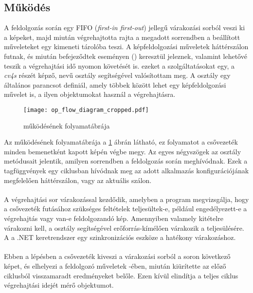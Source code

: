 \subsection{Működés} \label{ssection:mukodes} A feldolgozás során egy FIFO (\textit{first-in first-out}) jellegű várakozási sorból veszi ki a képeket, majd miután végrehajtotta rajta a megadott sorrendben a beállított műveleteket egy kimeneti tárolóba teszi. A képfeldolgozási műveletek háttérszálon futnak, és miután befejeződtek eseményen () keresztül jeleznek, valamint lehetővé teszik a végrehajtási idő nyomon követését is. ezeket a szolgáltatásokat egy, a \emph{cv4s} részét képző,  nevű osztály segítségével valósítottam meg. A  osztály egy általános parancsot definiál, amely többek között lehet egy képfeldolgozási művelet is, a  ilyen objektumokat használ a végrehajtásra.

\begin{figure}[h]
\vspace{.5cm}
\texttt{[image: op\_flow\_diagram\_cropped.pdf]}
\centering
\vspace{.2cm}
\caption{ működésének folyamatábrája}
\label{fig:op_flow_diagram}
\vspace{.5cm}
\end{figure}

Az  működésének folyamatábrája a \ref{fig:op_flow_diagram} ábrán látható, ez folyamatot a csővezeték minden bemenetként kapott képén végbe megy. Az egyes négyszögek az osztály metódusait jelentik, amilyen sorrendben a feldolgozás során meghívódnak. Ezek a tagfüggvények egy ciklusban hívódnak meg az adott alkalmazás konfigurációjának megfelelően háttérszálon, vagy az aktuális szálon.

\paragraph{} A végrehajtási sor várakozással kezdődik, amelyben a program megvizsgálja, hogy a csővezeték futásához szükséges feltételek teljesültek-e, például engedélyezett-e a végrehajtás vagy van-e feldolgozandó kép. Amennyiben valamely kitételre várakozni kell, a  osztály segítségével erőforrás-kímélően várakozik a teljesülésére. A  a .NET keretrendszer egy szinkronizációs eszköze a hatékony várakozáshoz.
\paragraph{} Ebben a lépésben a csővezeték kiveszi a  várakozási sorból a soron következő képet, és elhelyezi a feldolgozó műveletek -ében, miután kiürítette az előző ciklusból visszamaradt eredményeket belőle. Ezen kívül elindítja a teljes ciklus végrehajtási idejét mérő  objektumot.
